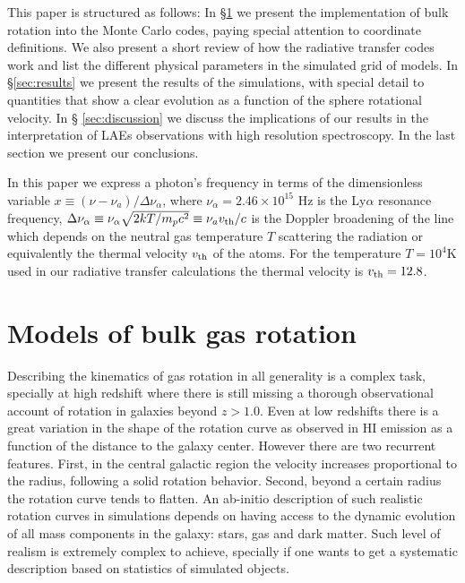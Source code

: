 \documentclass{emulateapj}
\newcommand{\ly}{{\ifmmode{{\rm Ly}\alpha~}\else{Ly$\alpha$~}\fi}}
\newcommand{\kms}{{\ifmmode{{\mathrm{\,km\ s}^{-1}}}\else{\,km~s$^{-1}$}\fi}}
\begin{document}
This paper is structured as follows: In \S \ref{sec:implementation} we
present the implementation of bulk rotation into the Monte Carlo
codes, paying special attention to coordinate definitions. We also
present a short review of how the \ly radiative transfer codes work
and list the different physical parameters in the simulated grid of
models. In \S \ref{sec:results} we present the results of the
simulations, with special detail to quantities that show a
clear evolution as a function of the sphere rotational velocity. In \S
\ref{sec:discussion} we discuss the implications of our results in the
interpretation of LAEs observations with high resolution
spectroscopy. In the last section we present our conclusions.    


In this paper we express a photon's frequency in terms of the
dimensionless variable $x\equiv (\nu -\nu_a)/\Delta\nu_\alpha$, where
$\nu_{\alpha}=2.46\times 10^{15}$ Hz is the Ly$\alpha$ resonance
frequency,  $\Delta\nu_{\alpha} \equiv
\nu_{\alpha}\sqrt{2kT/m_pc^2}\equiv \nu_av_{\rm th}/c $ is the Doppler
broadening of the line which depends on the neutral gas temperature
$T$ scattering the radiation or equivalently the thermal velocity
$v_{\rm th}$ of the atoms.  For the temperature $T=10^4$K used in our
radiative transfer calculations the thermal velocity is
$v_{\rm th}=12.8$\kms.  




\section{Models of bulk gas rotation}
\label{sec:implementation}

Describing the kinematics of gas rotation in all generality is a
complex task, specially at high redshift where there is still missing
a thorough observational account of rotation in galaxies beyond
$z>1.0$. Even at low redshifts there is a great
variation in the shape of the rotation curve as observed in HI
emission as a function of the distance to the galaxy center. However
there are two recurrent features. First, in the
central galactic region the velocity increases proportional to the radius,
following a solid rotation behavior. Second, beyond a certain radius
the rotation curve tends to flatten.  An ab-initio description of
such realistic rotation curves in simulations depends on having access to
the dynamic evolution of all mass components in the galaxy: stars, gas
and dark matter. Such level of realism is extremely complex to
achieve, specially if one wants to get a systematic description based
on statistics of simulated objects. 
\end{document}
